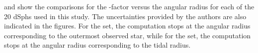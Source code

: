  and  show the comparisons for the \J-factor versus the angular radius for each of the 20 dSphs used in this study.
The uncertainties provided by the authors are also indicated in the figures.
For the \GS set, the computation stops at the angular radius corresponding to the outermost observed star, while for the \B set, the computation stops at the angular radius corresponding to the tidal radius.

\begin{figure}[ht]
\end{figure}
